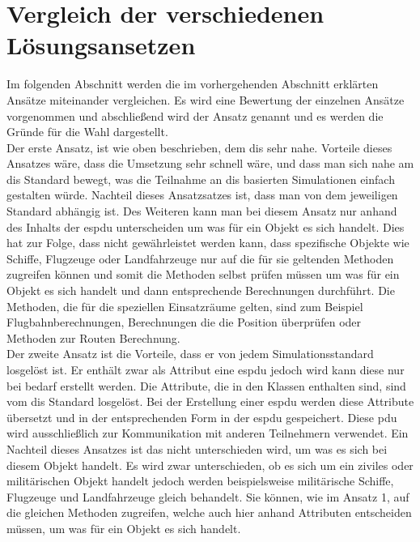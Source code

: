 \section{Vergleich der verschiedenen Lösungsansetzen} 
Im folgenden Abschnitt werden die im vorhergehenden Abschnitt erklärten Ansätze miteinander vergleichen. Es wird eine Bewertung der einzelnen Ansätze vorgenommen und abschließend wird der Ansatz genannt und es werden die Gründe für die Wahl dargestellt.\\
Der erste Ansatz, ist wie oben beschrieben, dem \ac{dis} sehr nahe. Vorteile dieses Ansatzes wäre, dass die Umsetzung sehr schnell wäre, und dass man sich nahe am \ac{dis} Standard bewegt, was die Teilnahme an \ac{dis} basierten Simulationen einfach gestalten würde. Nachteil dieses Ansatzsatzes ist, dass man von dem jeweiligen Standard abhängig ist. Des Weiteren kann man bei diesem Ansatz nur anhand des Inhalts der \ac{espdu} unterscheiden um was für ein Objekt es sich handelt. Dies hat zur Folge, dass nicht gewährleistet werden kann, dass  spezifische Objekte wie Schiffe, Flugzeuge oder Landfahrzeuge nur auf die für sie geltenden Methoden zugreifen können und somit die Methoden selbst prüfen müssen um was für ein Objekt es sich handelt und dann entsprechende Berechnungen durchführt. Die Methoden, die für die speziellen Einsatzräume gelten, sind zum Beispiel Flugbahnberechnungen, Berechnungen die die Position überprüfen oder Methoden zur Routen Berechnung.    \\
Der zweite  Ansatz ist die Vorteile, dass er von jedem Simulationsstandard losgelöst ist. Er enthält zwar als Attribut eine \ac{espdu} jedoch wird kann diese nur bei bedarf erstellt werden. Die Attribute, die in den Klassen enthalten sind, sind vom \ac{dis} Standard losgelöst. Bei der Erstellung  einer  \ac{espdu} werden diese Attribute übersetzt und in der entsprechenden Form in der \ac{espdu} gespeichert. Diese \ac{pdu} wird ausschließlich zur Kommunikation mit anderen Teilnehmern verwendet. Ein Nachteil dieses Ansatzes ist das nicht unterschieden wird, um was es sich bei diesem Objekt handelt. Es wird zwar unterschieden, ob es sich um ein ziviles oder militärischen Objekt handelt jedoch werden beispielsweise militärische Schiffe, Flugzeuge und Landfahrzeuge gleich behandelt. Sie können, wie im Ansatz 1, auf die gleichen Methoden zugreifen, welche auch hier anhand Attributen entscheiden müssen, um was für ein Objekt es sich handelt. \\
